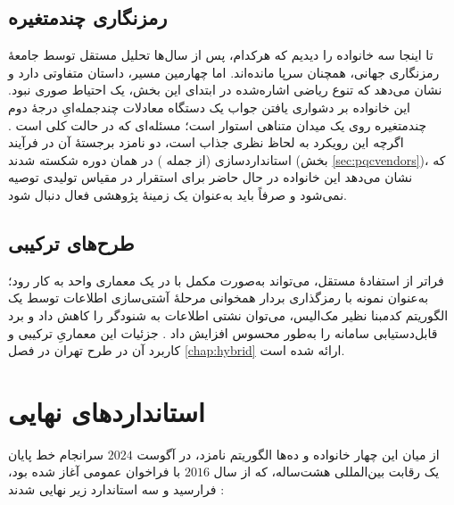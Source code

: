 \subsection{رمزنگاری چندمتغیره }

تا اینجا سه خانواده را دیدیم که هرکدام، پس از سال‌ها تحلیل مستقل توسط جامعهٔ رمزنگاری جهانی، همچنان سرپا مانده‌اند. اما چهارمین مسیر، داستان متفاوتی دارد و نشان می‌دهد که تنوع ریاضی اشاره‌شده در ابتدای این بخش، یک احتیاط صوری نبود. این خانواده بر دشواری یافتن جواب یک دستگاه معادلات چندجمله‌ایِ درجهٔ دوم چندمتغیره روی یک میدان متناهی استوار است؛ مسئله‌ای که در حالت کلی  است \Cite{djordjevic2025pqc}. اگرچه این رویکرد به لحاظ نظری جذاب است، دو نامزد برجستهٔ آن در فرآیند استانداردسازی  (از جمله ) در همان دوره شکسته شدند (بخش \ref{sec:pqcvendors})، که نشان می‌دهد این خانواده در حال حاضر برای استقرار در مقیاس تولیدی توصیه نمی‌شود و صرفاً باید به‌عنوان یک زمینهٔ پژوهشی فعال دنبال شود.

\subsection{طرح‌های ترکیبی }

فراتر از استفادهٔ مستقل،  می‌تواند به‌صورت مکمل با  در یک معماری واحد به کار رود؛ به‌عنوان نمونه با رمزگذاری بردار همخوانی  مرحلهٔ آشتی‌سازی اطلاعات  توسط یک الگوریتم کدمبنا نظیر مک‌الیس، می‌توان نشتی اطلاعات به شنودگر را کاهش داد و برد قابل‌دستیابی سامانه را به‌طور محسوس افزایش داد \Cite{djordjevic2025pqc}. جزئیات این معماریِ ترکیبی و کاربرد آن در طرح تهران در فصل \ref{chap:hybrid} ارائه شده است.

\section{استانداردهای نهایی }

از میان این چهار خانواده و ده‌ها الگوریتم نامزد، در آگوست $2024$ سرانجام خط پایان یک رقابت بین‌المللی هشت‌ساله، که از سال $2016$ با فراخوان عمومی  آغاز شده بود، فرارسید و سه استاندارد زیر نهایی شدند \Cite{fips203,fips204,fips205}:

